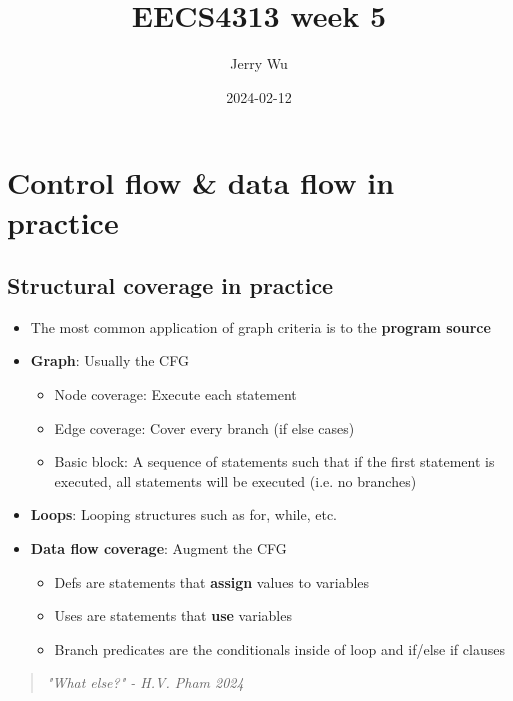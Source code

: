\documentclass[12pt]{book}
\title{EECS4313 week 5}
\author{Jerry Wu}
\date{2024-02-12}
\begin{document}
\maketitle
\tableofcontents

\chapter{Control flow \& data flow in practice}

\section{Structural coverage in practice}

\begin{itemize}
  \item The most common application of graph criteria is to the \textbf{program source}
  \item \textbf{Graph}: Usually the CFG
  \begin{itemize}
    \item Node coverage: Execute each statement
    \item Edge coverage: Cover every branch (if else cases)
    \item Basic block: A sequence of statements such that if the first statement is executed, all statements will be executed (i.e. no branches)
  \end{itemize} 

  \item \textbf{Loops}: Looping structures such as for, while, etc.
  \item \textbf{Data flow coverage}: Augment the CFG
  \begin{itemize}
    \item Defs are statements that \textbf{assign} values to variables
    \item Uses are statements that \textbf{use} variables
    \item Branch predicates are the conditionals inside of loop and if/else if clauses
  \end{itemize} 
\end{itemize}

\begin{quote}
  \textit{"What else?" - H.V. Pham 2024}
\end{quote}
\end{document}
